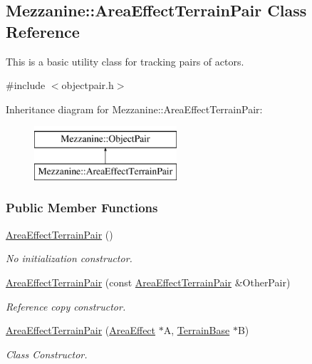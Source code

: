 \hypertarget{classMezzanine_1_1AreaEffectTerrainPair}{
\subsection{Mezzanine::AreaEffectTerrainPair Class Reference}
\label{classMezzanine_1_1AreaEffectTerrainPair}
}


This is a basic utility class for tracking pairs of actors.  




{\ttfamily \#include $<$objectpair.h$>$}

Inheritance diagram for Mezzanine::AreaEffectTerrainPair:\begin{figure}[H]
\begin{center}
\leavevmode
\includegraphics[height=2.000000cm]{classMezzanine_1_1AreaEffectTerrainPair}
\end{center}
\end{figure}
\subsubsection*{Public Member Functions}
\begin{DoxyCompactItemize}
\item 
\hypertarget{classMezzanine_1_1AreaEffectTerrainPair_a2bde1985c7e06838aaad72e50898168e}{
\hyperlink{classMezzanine_1_1AreaEffectTerrainPair_a2bde1985c7e06838aaad72e50898168e}{AreaEffectTerrainPair} ()}
\label{classMezzanine_1_1AreaEffectTerrainPair_a2bde1985c7e06838aaad72e50898168e}

\begin{DoxyCompactList}\small\item\em No initialization constructor. \item\end{DoxyCompactList}\item 
\hyperlink{classMezzanine_1_1AreaEffectTerrainPair_a64791bc5ed36c7bb9c95ab4d7e4a08d1}{AreaEffectTerrainPair} (const \hyperlink{classMezzanine_1_1AreaEffectTerrainPair}{AreaEffectTerrainPair} \&OtherPair)
\begin{DoxyCompactList}\small\item\em Reference copy constructor. \item\end{DoxyCompactList}\item 
\hyperlink{classMezzanine_1_1AreaEffectTerrainPair_ad3fe92b0fd4fb4478b5a75781eb67e6b}{AreaEffectTerrainPair} (\hyperlink{classMezzanine_1_1AreaEffect}{AreaEffect} $\ast$A, \hyperlink{classMezzanine_1_1TerrainBase}{TerrainBase} $\ast$B)
\begin{DoxyCompactList}\small\item\em Class Constructor. \item\end{DoxyCompactList}\end{DoxyCompactItemize}
